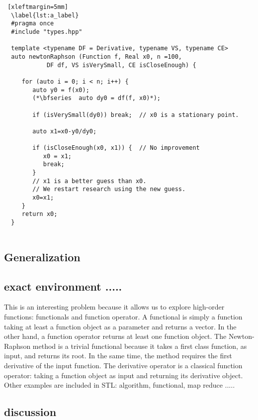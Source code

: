 \documentclass[12pt]{article}
\begin{document}
  
  \begin{lstlisting} [xleftmargin=5mm]
  \label{lst:a_label}
  #pragma once
  #include "types.hpp"
  
  template <typename DF = Derivative, typename VS, typename CE> 
  auto newtonRaphson (Function f, Real x0, n =100, 
  		    DF df, VS isVerySmall, CE isCloseEnough) {
  
     for (auto i = 0; i < n; i++) {
        auto y0 = f(x0);
        (*\bfseries  auto dy0 = df(f, x0)*);
  
        if (isVerySmall(dy0)) break;  // x0 is a stationary point.
        
        auto x1=x0-y0/dy0;
            
        if (isCloseEnough(x0, x1)) {  // No improvement 
           x0 = x1; 
           break;
        }   
        // x1 is a better guess than x0.
        // We restart research using the new guess.
        x0=x1;
     }   
     return x0; 
  }
  
  \end{lstlisting}
  
   \subsection {Generalization}
   \citet*{meyers2014effective} 
  \subsection {exact environment .....}
  
  This is an interesting problem because it allows us to explore high-order functions: functionals and function operator.
  A functional is simply a function taking at least a function object as a parameter and returns a vector.  In the other hand, a function operator returns at least one function object.
  The Newton-Raphson method is a trivial functional because it takes a first class function, as input,  and returns its root.  In the same time, the method requires the first derivative of the input function.  
  The derivative operator is a classical function operator: taking a function object as input and returning its derivative object. 
  Other examples are included in STL: algorithm, functional, map reduce .....
  \subsection {discussion}
  
\end{document}
